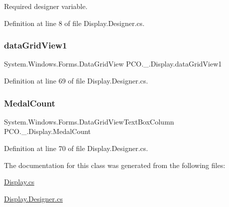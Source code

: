 Required designer variable. 



Definition at line 8 of file Display.\+Designer.\+cs.

\mbox{\label{classPCO_1_1__0_1_1Display_a6ce931b1d769166bae50e36dd725f25b}} 
\subsubsection{\texorpdfstring{data\+Grid\+View1}{dataGridView1}}
{\footnotesize\ttfamily System.\+Windows.\+Forms.\+Data\+Grid\+View P\+C\+O.\+\_.\+Display.\+data\+Grid\+View1\hspace{0.3cm}{\ttfamily [private]}}



Definition at line 69 of file Display.\+Designer.\+cs.

\mbox{\label{classPCO_1_1__0_1_1Display_adce8cb6a82a4b034fe3b85f2192a0176}} 
\subsubsection{\texorpdfstring{Medal\+Count}{MedalCount}}
{\footnotesize\ttfamily System.\+Windows.\+Forms.\+Data\+Grid\+View\+Text\+Box\+Column P\+C\+O.\+\_.\+Display.\+Medal\+Count\hspace{0.3cm}{\ttfamily [private]}}



Definition at line 70 of file Display.\+Designer.\+cs.



The documentation for this class was generated from the following files\+:\begin{DoxyCompactItemize}
\item 
\hyperlink{Display_8cs}{Display.\+cs}\item 
\hyperlink{Display_8Designer_8cs}{Display.\+Designer.\+cs}\end{DoxyCompactItemize}
